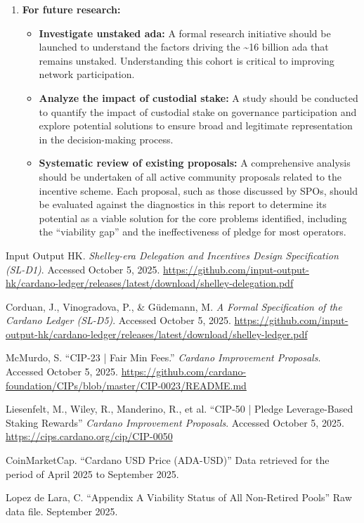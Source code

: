 \documentclass[11pt, letterpaper]{article}
\begin{document}
\begin{enumerate}
	\item \textbf{For future research:}
	      \begin{itemize}
		      \item \textbf{Investigate unstaked ada:} A formal research initiative should be launched to understand
		            the factors driving the \textasciitilde16 billion ada that remains unstaked. Understanding this cohort
		            is critical to improving network participation.
		      \item \textbf{Analyze the impact of custodial stake:} A study should be conducted to quantify the impact
		            of custodial stake on governance participation and explore potential solutions to ensure broad and
		            legitimate representation in the decision-making process.
		      \item \textbf{Systematic review of existing proposals:} A comprehensive analysis should be undertaken of all
		            active community proposals related to the incentive scheme. Each proposal, such as those discussed
		            by SPOs, should be evaluated against the diagnostics in this report to determine its potential as a
		            viable solution for the core problems identified, including the ``viability gap'' and the ineffectiveness
		            of pledge for most operators.
	      \end{itemize}
\end{enumerate}

\newpage
\begin{thebibliography}{9}

	Input Output HK\@. \textit{Shelley-era Delegation and Incentives Design Specification (SL-D1)}.
	Accessed October 5, 2025.
	\url{https://github.com/input-output-hk/cardano-ledger/releases/latest/download/shelley-delegation.pdf}

	Corduan, J., Vinogradova, P., \& Güdemann, M. \textit{A Formal Specification of the Cardano Ledger (SL-D5)}.
	Accessed October 5, 2025.
	\url{https://github.com/input-output-hk/cardano-ledger/releases/latest/download/shelley-ledger.pdf}

	McMurdo, S. ``CIP-23 | Fair Min Fees.'' \textit{Cardano Improvement Proposals}.
	Accessed October 5, 2025. \url{https://github.com/cardano-foundation/CIPs/blob/master/CIP-0023/README.md}

	Liesenfelt, M., Wiley, R., Manderino, R., et al. ``CIP-50 | Pledge Leverage-Based Staking Rewards''
	\textit{Cardano Improvement Proposals}. Accessed October 5, 2025. \url{https://cips.cardano.org/cip/CIP-0050}

	CoinMarketCap. ``Cardano USD Price (ADA-USD)''
	Data retrieved for the period of April 2025 to September 2025.

	Lopez de Lara, C. ``Appendix A\: Viability Status of All Non-Retired Pools''
	Raw data file. September 2025.

\end{thebibliography}
\end{document}
